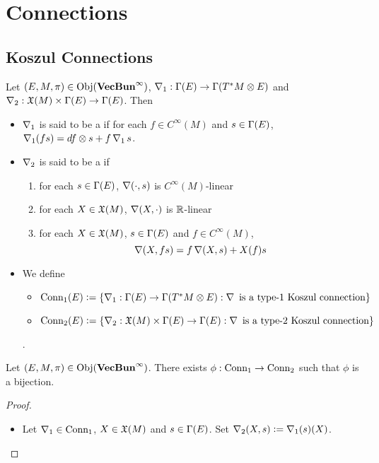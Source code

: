 \documentclass{book}
\begin{document}
	
	\newpage
	\chapter{Connections}
	
	\section{Koszul Connections}
	
	\begin{defn}
		Let $(E, M, \pi) \in \operatorname{Obj}(\operatorname*{\text{\textbf{VecBun}}^{\infty}})$, $\operatorname{\nabla}_1 : \Gamma(E) \rightarrow \Gamma(T^*M \otimes E)$ and $\operatorname{\nabla}_2: \mathfrak{X}(M) \times \Gamma(E) \rightarrow \Gamma(E)$. Then 
		\begin{itemize}
			\item $\operatorname{\nabla}_1$ is said to be a  if for each $f \in C^{\infty}(M)$ and $s \in \Gamma(E)$, $\operatorname{\nabla}_1 (fs) = df \otimes s + f \operatorname{\nabla}_1 s$.
			\item $\operatorname{\nabla}_2$ is said to be a  if 
			\begin{enumerate}
				\item for each $s \in \Gamma(E)$, $\operatorname{\nabla}(\cdot, s)$ is $C^{\infty}(M)$-linear
				\item for each $X \in \mathfrak{X}(M)$, $\operatorname{\nabla}(X, \cdot)$ is $\mathbb{R}$-linear
				\item for each $X \in \mathfrak{X}(M)$, $s \in \Gamma(E)$ and $f \in C^{\infty}(M)$, 
				$$\operatorname{\nabla}(X, fs) = f \operatorname{\nabla}(X, s) + X(f) s$$ 
			\end{enumerate}
			\item We define 
			\begin{itemize}
				\item $\text{Conn}_1(E) \vcentcolon= \{\operatorname{\nabla}_1 : \Gamma(E) \rightarrow \Gamma(T^*M \otimes E): \operatorname{\nabla} \text{ is a type-$1$ Koszul connection}\}$ 
				\item $\text{Conn}_2(E) \vcentcolon= \{\operatorname{\nabla}_2: \mathfrak{X}(M) \times \Gamma(E) \rightarrow \Gamma(E): \operatorname{\nabla} \text{ is a type-$2$ Koszul connection}\}$ 
			\end{itemize}.
		\end{itemize}
	\end{defn}

	\begin{ex}
		Let $(E, M, \pi) \in \operatorname{Obj}(\operatorname*{\text{\textbf{VecBun}}^{\infty}})$. There exists $\phi: \text{Conn}_1 \rightarrow \text{Conn}_2$ such that $\phi$ is a bijection. 
	\end{ex}

	\begin{proof}
		\begin{itemize}
			\item Let $\operatorname{\nabla}_1 \in \text{Conn}_1$, $X \in \mathfrak{X}(M)$ and $s \in \Gamma(E)$. Set $\operatorname{\nabla}_2(X, s) \vcentcolon= \operatorname{\nabla}_1(s)(X)$. 
		\end{itemize}
	\end{proof}
\end{document}
